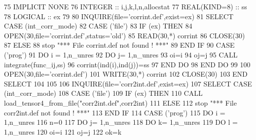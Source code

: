 \begin{DoxyCode}
75     \textcolor{keywordtype}{IMPLICIT NONE}
76     \textcolor{keywordtype}{INTEGER} :: i,j,k,l,n,allocstat
77     \textcolor{keywordtype}{REAL(KIND=8)} :: ss
78     \textcolor{keywordtype}{LOGICAL} :: ex
79 
80     \textcolor{keyword}{INQUIRE}(file=\textcolor{stringliteral}{'corrint.def'},exist=ex)
81     \textcolor{keywordflow}{SELECT CASE} (int\_corr\_mode)
82     \textcolor{keywordflow}{CASE} (\textcolor{stringliteral}{'file'})
83        \textcolor{keywordflow}{IF} (ex) \textcolor{keywordflow}{THEN}
84           \textcolor{keyword}{OPEN}(30,file=\textcolor{stringliteral}{'corrint.def'},status=\textcolor{stringliteral}{'old'})
85           \textcolor{keyword}{READ}(30,*) corrint
86           \textcolor{keyword}{CLOSE}(30)
87        \textcolor{keywordflow}{ELSE}
88           stop \textcolor{stringliteral}{"*** File corrint.def not found ! ***"}
89 \textcolor{keywordflow}{       END IF}
90     \textcolor{keywordflow}{CASE} (\textcolor{stringliteral}{'prog'})
91        \textcolor{keywordflow}{DO} i = 1,n\_unres
92           \textcolor{keywordflow}{DO} j= 1,n\_unres
93              oi=i
94              oj=j
95              \textcolor{keyword}{CALL }integrate(func\_ij,ss)
96              corrint(ind(i),ind(j))=ss
97 \textcolor{keywordflow}{          END DO}
98 \textcolor{keywordflow}{       END DO}
99 
100        \textcolor{keyword}{OPEN}(30,file=\textcolor{stringliteral}{'corrint.def'})
101        \textcolor{keyword}{WRITE}(30,*) corrint
102        \textcolor{keyword}{CLOSE}(30)
103 \textcolor{keywordflow}{    END SELECT}
104 
105 
106     \textcolor{keyword}{INQUIRE}(file=\textcolor{stringliteral}{'corr2int.def'},exist=ex)
107     \textcolor{keywordflow}{SELECT CASE} (int\_corr\_mode)
108     \textcolor{keywordflow}{CASE} (\textcolor{stringliteral}{'file'})
109        \textcolor{keywordflow}{IF} (ex) \textcolor{keywordflow}{THEN}
110           \textcolor{keyword}{CALL }load\_tensor4\_from\_file(\textcolor{stringliteral}{"corr2int.def"},corr2int)
111        \textcolor{keywordflow}{ELSE}
112           stop \textcolor{stringliteral}{"*** File corr2int.def not found ! ***"}
113 \textcolor{keywordflow}{       END IF}
114     \textcolor{keywordflow}{CASE} (\textcolor{stringliteral}{'prog'})
115        \textcolor{keywordflow}{DO} i = 1,n\_unres
116           n=0
117           \textcolor{keywordflow}{DO} j= 1,n\_unres
118              \textcolor{keywordflow}{DO} k= 1,n\_unres
119                 \textcolor{keywordflow}{DO} l = 1,n\_unres
120                    oi=i
121                    oj=j
122                    ok=k

\end{DoxyCode}
